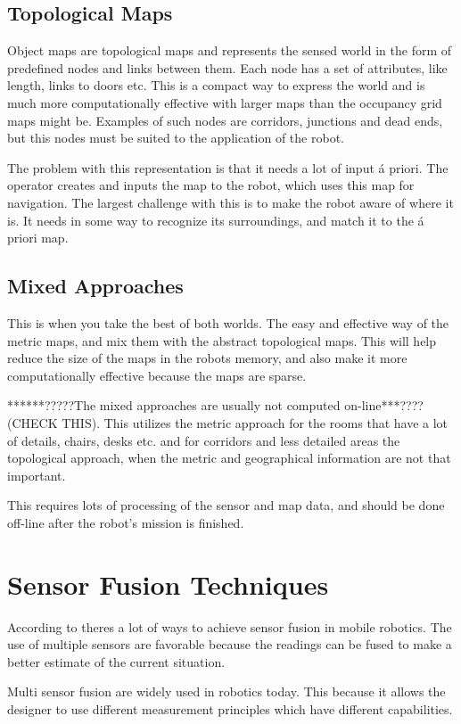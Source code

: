 \subsection{Topological Maps}
Object maps are topological maps and represents the sensed world in the form of predefined nodes and links
between them. Each node has a set of attributes, like length, links to doors etc. This is
a compact way to express the world and is much more computationally effective with larger
maps than the occupancy grid maps might be. Examples of such nodes are corridors,
junctions and dead ends, but this nodes must be suited to the application of the robot. 

The problem with this representation is that it needs a lot of input \'a priori. The
operator creates and inputs the map to the robot, which uses this map for navigation. The
largest challenge with this is to make the robot aware of where it is. It needs in some
way to recognize its surroundings, and match it to the \'a priori map.


\subsection{Mixed Approaches}
This is when you take the best of both worlds. The easy and effective way of the metric
maps, and mix them with the abstract topological maps. This will help reduce the size of
the maps in the robots memory, and also make it more computationally effective because the
maps are sparse. 

******?????The mixed approaches are usually not computed on-line***???? (CHECK THIS). This utilizes
the metric approach for the rooms that have a lot of details, chairs, desks etc. and for
corridors and less detailed areas the topological approach, when the metric and
geographical information are not that important. 

This requires lots of processing of the sensor and map data, and should be done off-line
after the robot's mission is finished. 


\section{Sensor Fusion Techniques}
According to \cite{sensor-fusion-mobile-robots} theres a lot of ways to achieve sensor
fusion in mobile robotics. The use of multiple sensors are favorable because the readings
can be fused to make a better estimate of the current situation. 

Multi sensor fusion are widely used in robotics today. This because it allows the designer
to use different measurement principles which have different capabilities. 



